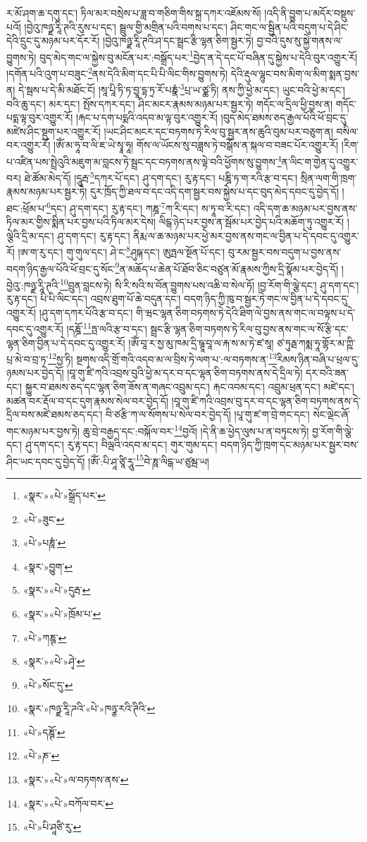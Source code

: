ར་མོ་ཤག་ཆ་དགུ་དང་། ཏིལ་མར་བསྲེས་པ་ཟླ་བ་གཅིག་གིས་སྐྲ་དཀར་འཇོམས་སོ། །འདི་ནི་བྱུག་པ་མདོར་བསྡུས་པའོ། །བྱེའུ་ཁཉྫ་རཱི་ཊའི་རུས་པ་དང་། སྦྲུལ་གྱི་མགྲིན་པའི་བགས་པ་དང་། ཤིང་གང་ལ་སྦྱིན་པའི་བདུག་པ་དེ་ཤིང་དེའི་དྲུང་དུ་མཉམ་པར་དོར་རོ། །བྱེའུ་ཁཉྫ་རཱི་ཊའི་ཤ་དང་སྦྲང་རྩི་ལྷན་ཅིག་སྦྱར་ཏེ། བྱ་བའི་དུས་སུ་སྐྱེ་གནས་ལ་བྱུགས་ཏེ། བུད་མེད་གང་ལ་སྐྱེས་བུ་མངོན་པར་:བསྒྲོད་པར་\footnote{«སྣར་»«པེ་»སྒྲོད་པར་}བྱེད་ན་དེ་དང་པོ་བཞིན་དུ་སྐྱེས་པ་དེའི་བུར་འགྱུར་རོ། །དགོན་པའི་འུག་པ་བཟུང་\footnote{«པེ་»ཟུང་}ནས་དེའི་མིག་དང་པི་པི་ལིང་གིས་བྱུགས་ཏེ། དེའི་རྡུལ་ལྷུང་བས་མིག་ལ་མིག་སྨན་བྱས་ན། དེ་སྦས་པ་དེ་མི་མཐོང་ངོ། །སཱ་པཱི་ཏི་ཏ་བྱཱ་དྷ་ཏྲ་རོ་པཎྣཾ་\footnote{«པེ་»པཎཱཾ་}པྲ་ཡ་ཙྪ་ཏི། ནས་ཀྱི་ཕྱེ་མ་དང་། ཡུང་བའི་ཕྱེ་མ་དང་། བའི་ཆུ་དང་། མར་དང་། སྤོས་དཀར་དང་། ཤིང་མངར་རྣམས་མཉམ་པར་སྦྱར་ཏེ། གདོང་ལ་དྲིལ་ཕྱི་བྱས་ན། གདོང་པདྨ་ལྟ་བུར་འགྱུར་རོ། །རྐང་པ་དག་པདྨའི་འདབ་མ་ལྟ་བུར་འགྱུར་རོ། །བུད་མེད་ཐམས་ཅད་རྒྱལ་པོའི་ཕོ་བྲང་དུ་མཛེས་ཤིང་སྡུག་པར་འགྱུར་རོ། །ཡང་ཤིང་མངར་དང་བཏགས་ཏེ་རིལ་བུ་སྦྱར་ནས་ཆུའི་བུམ་པར་བཅུག་ན། བསིལ་བར་འགྱུར་རོ། །ཨོཾ་མ་ཧཱ་བ་ལི་ཇ་ཡེ་སྭཱ་ཧཱ། གོས་ལ་ཡོངས་སུ་བཟླས་ཏེ་བསྒོས་ན་སྐལ་བ་བཟང་པོར་འགྱུར་རོ། །རིག་པ་འཛིན་པས་སྤྲེའུའི་མཇུག་མ་བླངས་ཏེ་སྦྲང་དང་བཏགས་ནས་ལྟེ་བའི་ཕྱོགས་སུ་བྱུགས་\footnote{«སྣར་»བྱུག་}ན་ལིང་ག་གྱེན་དུ་འགྱུར་བར། ཐེ་ཚོམ་མེད་དོ། །དཱུརྦ་\footnote{«སྣར་»«པེ་»དུརྦ་}དཀར་པོ་དང་། ཤུ་དག་དང་། རུ་རྟ་དང་། པཎྜི་ཏ་ག་རའི་རྩ་བ་དང་། སྲིན་ལག་གི་ཁྲག་རྣམས་མཉམ་པར་སྦྱར་ཏེ། དུར་ཁྲོད་ཀྱི་ཐལ་བ་དང་འདི་དག་སྦྱར་བས་སྐྱེས་པ་དང་བུད་མེད་དབང་དུ་བྱེད་དོ། །ཐང་:ཕྲོམ་པ་\footnote{«སྣར་»«པེ་»ཁྲོམ་པ་}དང་། ཤུ་དག་དང་། རུ་རྟ་དང་། ཀཎྜ་\footnote{«པེ་»ཀཎྚ་}ཀ་རི་དང་། ས་ཏཱ་བ་རི་དང་། འདི་དག་ཆ་མཉམ་པར་བྱས་ནས་ཏིལ་མར་གྱིས་སྨིན་པར་བྱས་པའི་ཏིལ་མར་དེས། ལིངྒ་ཉེད་པར་བྱས་ན་སྦོམ་པར་བྱེད་པའི་མཆོག་ཏུ་འགྱུར་རོ། །ལྕེའི་དྲི་མ་དང་། ཤུ་དག་དང་། རུ་རྟ་དང་། ནིརྨ་ལ་ཆ་མཉམ་པར་ཕྱེ་མར་བྱས་ནས་གང་ལ་བྱིན་པ་དེ་དབང་དུ་འགྱུར་རོ། །ཨ་ག་རུ་དང་། གུ་གུལ་དང་། ཤེ་ང་\footnote{«སྣར་»«པེ་»ཤྭེ་}ཤུཥྐ་དང་། ཨུཏྤལ་སྔོན་པོ་དང་། བུ་རམ་སྦྱར་བས་བདུག་པ་བྱས་ནས་བདག་ཉིད་རྒྱལ་པོའི་ཕོ་བྲང་དུ་སོང་\footnote{«པེ་»སོང་དུ་}ན་མཆོད་པ་ཆེན་པོ་ཐོབ་ཅིང་བཙུན་མོ་རྣམས་ཀྱིས་དྲི་སྣོམ་པར་བྱེད་དོ། །བྱེའུ་:ཁཉྫ་རཱི་ཊའི་\footnote{«སྣར་»ཁཉྫ་རཱི་ཌའི་«པེ་»ཁཉྩ་རའི་ཊིའི་}བྲུན་བླངས་ཏེ། སི་རི་སའི་ས་བོན་བྱུགས་པས་འཆི་བ་སེལ་ཏོ། །བྱ་རོག་གི་ལྕེ་དང་། ཤུ་དག་དང་། རུ་རྟ་དང་། པི་པི་ལིང་དང་། འབྲས་ཐུག་པོ་ཆེ་བདུན་དང་། བདག་ཉིད་ཀྱི་ཁུ་བ་སྦྱར་ཏེ་གང་ལ་བྱིན་པ་དེ་དབང་དུ་འགྱུར་རོ། །ཤུ་དག་དཀར་པོའི་རྩ་བ་དང་། གི་ཝང་ལྷན་ཅིག་བཏགས་ཏེ་དེའི་ཐིག་ལེ་བྱས་ནས་གང་ལ་བལྟས་པ་དེ་དབང་དུ་འགྱུར་རོ། །དཎྜོ་\footnote{«པེ་»དཎྚོ་}ཏྤ་ལའི་རྩ་བ་དང་། སྦྲང་རྩི་ལྷན་ཅིག་བཏགས་ཏེ་རིལ་བུ་བྱས་ནས་གང་ལ་སོ་རྩི་དང་ལྷན་ཅིག་བྱིན་པ་དེ་དབང་དུ་འགྱུར་རོ། །ཨོཾ་བཱ་ར་སྱ་མུ་ཁམ་དྲི་ཥྚཱ་བཱ་ལ་རྐ་ས་མ་ཏེ་ཛ་སཱ། ཙ་ཏུརྠ་ཀམྨ་ཧཱ་གྷོར་མ་ཀྵི་པྲ་མེ་བ་བྲ་ཏ་\footnote{«པེ་»ཎ་}སྱ་ཏི། སྔགས་འདི་གྲོ་གའི་འདབ་མ་ལ་བྲིས་ཏེ་ལག་པ་:ལ་བཏགས་ན་\footnote{«སྣར་»«པེ་»ལ་བཏགས་ནས་}རིམས་ཉིན་བཞི་པ་ཕྲལ་དུ་ཉམས་པར་བྱེད་དོ། །བཱ་གུ་ཛི་ཀའི་འབྲས་བུའི་ཕྱེ་མ་དར་བ་དང་ལྷན་ཅིག་བཏགས་ནས་དེ་དྲིལ་ཏེ། དར་བའི་ཟན་དང་། སྐྱུར་བ་ཐམས་ཅད་དང་ལྷན་ཅིག་ཟོས་ན་གཞང་འབྲུམ་དང་། རྐང་འབམ་དང་། འབྲུམ་ཕྲན་དང་། མཛེ་དང་། མཚན་བར་རྡོལ་བ་དང་དུག་རྣམས་སེལ་བར་བྱེད་དོ། །བཱ་གུ་ཛི་ཀའི་འབྲས་བུ་དར་བ་དང་ལྷན་ཅིག་བཏགས་ནས་དེ་དྲིལ་བས་མཛེ་ཐམས་ཅད་དང་། བི་ཙརྩི་ཀ་ལ་སོགས་པ་སེལ་བར་བྱེད་དོ། །པཱ་གུ་ཛ་ག་བྲེ་གང་དང་། སེང་ལྡེང་ཞོ་གང་མཉམ་པར་བྱས་ཏེ། ཆུ་བྲེ་བརྒྱད་དང་:བསྐོལ་བར་\footnote{«སྣར་»«པེ་»བཀོལ་བར་}བྱའོ། །དེ་ནི་ཆ་ཕྱེད་ལུས་པ་ན་བཏུངས་ཏེ། བྱ་རོག་གི་ལྕེ་དང་། ཤུ་དག་དང་། རུ་རྟ་དང་། བིལྦའི་འདབ་མ་དང་། གུར་གུམ་དང་། བདག་ཉིད་ཀྱི་ཁྲག་དང་མཉམ་པར་སྦྱར་བས་ཤིང་ཡང་དབང་དུ་བྱེད་དོ། །ཨོཾ་:པི་ཤཱ་ཙཱི་རཱུ་\footnote{«པེ་»པི་ཤཱཙི་རུ་}བེ་ཎཱ་ལིངྒ་ཡ་ཙུམྦ་ཡ། 